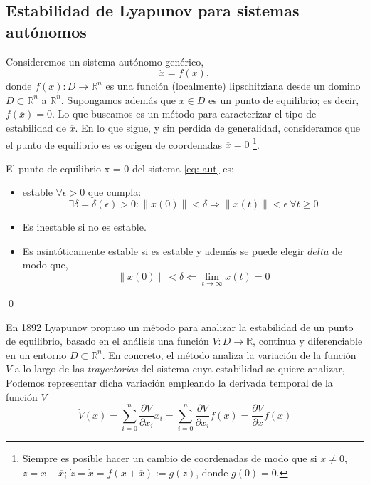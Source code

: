 \subsection{Estabilidad de Lyapunov para sistemas autónomos}
Consideremos un sistema autónomo genérico,
\begin{equation}\label{eq: aut}
\dot x = f(x),
\end{equation}
donde $f(x): D\rightarrow \mathbb{R}^n$ es una función (localmente) lipschitziana desde un domino $D \subset \mathbb{R}^n$ a $\mathbb{R}^n$. Supongamos además que $\overline x \in D$ es un punto de equilibrio; es decir, $f(\overline x) = 0$. Lo que buscamos es un método para caracterizar el tipo de estabilidad de $\overline x$. En lo que sigue, y sin perdida de generalidad, consideramos que el punto de equilibrio es es origen de coordenadas $\overline x = 0$ \footnote{Siempre es posible hacer un cambio de coordenadas de modo que si $\overline x \neq 0$, $z = x-\overline x$; $\dot z = \dot x = f(x+\overline x) := g(z)$, donde $g(0)=0$.}.

\begin{definition} \label{def: est}
El punto de equilibrio x = 0 del sistema \ref{eq: aut} es:
\begin{itemize}
\item estable $\forall \epsilon > 0$ que cumpla:
\begin{equation*}
 \exists \delta =\delta(\epsilon)>0: \| x(0) \| < \delta \Rightarrow \| x(t)\| < \epsilon \ \forall t \ge 0
\end{equation*}
 
 \item Es inestable si no es estable.
 \item Es asintóticamente estable si es estable y además se puede elegir $delta$ de modo que,
\begin{equation*}
\| x(0)\| < \delta \Leftarrow \lim_{t \to \infty} x(t) = 0
\end{equation*}
\end{itemize}
\qed
\end{definition}

En 1892 Lyapunov propuso un método para analizar la estabilidad de un punto de equilibrio, basado en el análisis  una función $V:D\to \mathbb{R}$, continua y diferenciable en un entorno $D \subset \mathbb{R}^n$. En concreto, el método analiza la variación de la función $V$ a lo largo de las \emph{trayectorias} del sistema cuya estabilidad se quiere analizar, Podemos representar dicha variación empleando la derivada temporal de la función $V$
\begin{equation} \label{eq: dlyap}
\dot V(x) = \sum_{i=0}^{n}\frac{\partial V}{\partial x_i} \dot x_i = \sum_{i=0}^{n}\frac{\partial V}{\partial x_i} f(x) = \frac{\partial V}{\partial x}f(x)
\end{equation}

